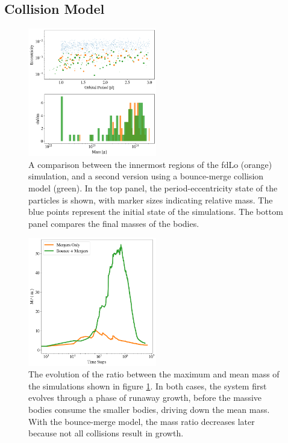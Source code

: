 \documentclass[twocolumn]{aastex63}
\begin{document}

\subsection{Collision Model}

\begin{figure}
\begin{center}
    \includegraphics[width=0.5\textwidth]{figures/frag_ecc.png}
    \caption{A comparison between the innermost regions of the fdLo (orange) simulation, and a second version using a bounce-merge collision model (green). In the top panel, the period-eccentricity state of the particles is shown, with marker sizes indicating relative mass. The blue points represent the initial state of the simulations. The bottom panel compares the final masses of the bodies. \label{fig:frag_ecc}}
\end{center}
\end{figure}

\begin{figure}
\begin{center}
    \includegraphics[width=0.5\textwidth]{figures/frag_evo.png}
    \caption{The evolution of the ratio between the maximum and mean mass of the simulations shown in figure \ref{fig:frag_ecc}. In both cases, the system first evolves through a phase of runaway growth, before the massive bodies consume the smaller bodies, driving down the mean mass. With the bounce-merge model, the mass ratio decreases later because not all collisions result in growth.\label{fig:frag_evo}}
\end{center}
\end{figure}
\end{document}
